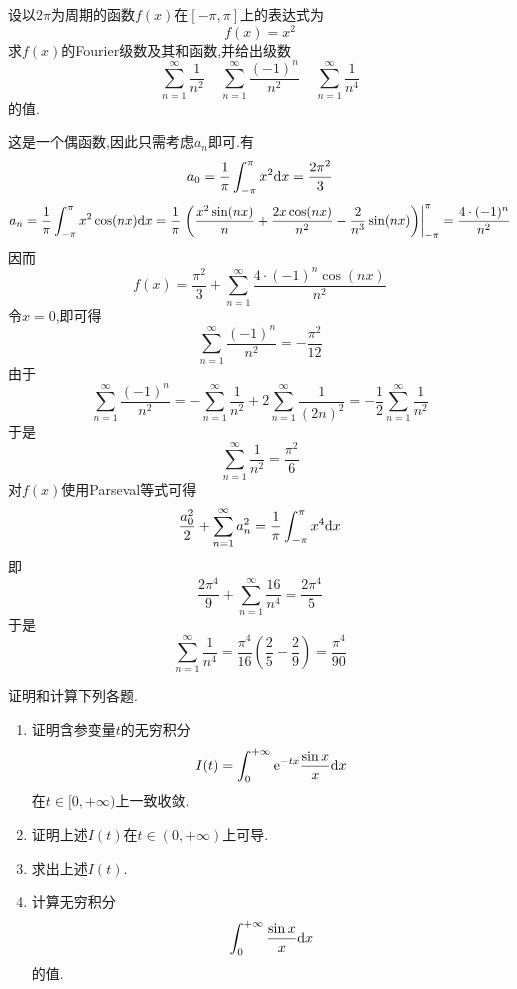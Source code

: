 \documentclass{ctexart}
\begin{document}
\begin{problem}[7.(20\songti{分})]
    设以$2\pi$为周期的函数$f(x)$在$[-\pi,\pi]$上的表达式为
    \[f(x)=x^2\]
    求$f(x)$的Fourier级数及其和函数,并给出级数
    \[\sum_{n=1}^{\infty}\dfrac{1}{n^2}
    \ \ \ \ \ \sum_{n=1}^{\infty}\dfrac{(-1)^n}{n^2}
    \ \ \ \ \ \sum_{n=1}^{\infty}\dfrac{1}{n^4}\]
    的值.

\end{problem}
\begin{solution}
    这是一个偶函数,因此只需考虑$a_n$即可.有
    \[a_0=\dfrac{1}{\pi}\int_{-\pi}^{\pi}x^2\mathrm{d} x=\dfrac{2\pi^2}{3}\]
    \[a_n=\dfrac{1}{\pi}\int_{-\pi}^{\pi}x^2\cos(nx)\mathrm{d} x
    =\dfrac{1}{\pi}\left.\left(\dfrac{x^2\sin(nx)}{n}+\dfrac{2x\cos(nx)}{n^2}-\dfrac{2}{n^3}\sin(nx)\right)\right|_{-\pi}^{\pi}
    =\dfrac{4\cdot(-1)^n}{n^2}\]
    因而
    \[f(x)=\dfrac{\pi^2}{3}+\sum_{n=1}^{\infty}\dfrac{4\cdot(-1)^n\cos(nx)}{n^2}\]
    令$x=0$,即可得
    \[\sum_{n=1}^{\infty}\dfrac{(-1)^n}{n^2}=-\dfrac{\pi^2}{12}\]
    由于
    \[\sum_{n=1}^{\infty}\dfrac{(-1)^n}{n^2}=-\sum_{n=1}^{\infty}\dfrac{1}{n^2}+2\sum_{n=1}^{\infty}\dfrac{1}{(2n)^2}=-\dfrac12\sum_{n=1}^{\infty}\dfrac{1}{n^2}\]
    于是
    \[\sum_{n=1}^{\infty}\dfrac{1}{n^2}=\dfrac{\pi^2}{6}\]
    对$f(x)$使用Parseval等式可得
    \[\dfrac{a_0^2}{2}+\sum_{n=1}^{\infty}a_n^2=\dfrac{1}{\pi}\int_{-\pi}^{\pi}x^4\mathrm{d} x\]
    即
    \[\dfrac{2\pi^4}{9}+\sum_{n=1}^{\infty}\dfrac{16}{n^4}=\dfrac{2\pi^4}{5}\]
    于是
    \[\sum_{n=1}^{\infty}\dfrac{1}{n^4}=\dfrac{\pi^4}{16}\left(\dfrac{2}{5}-\dfrac{2}{9}\right)=\dfrac{\pi^4}{90}\]

\end{solution}
\begin{problem}[8.(10\songti{分})]
    证明和计算下列各题.
    \begin{enumerate}[label=\tbf{(\arabic*)},topsep=0pt,parsep=0pt,itemsep=0pt,partopsep=0pt]
        \item 证明含参变量$t$的无穷积分
            \[I(t)=\int_0^{+\infty}\mathrm{e}^{-tx}\dfrac{\sin x}{x}\mathrm{d} x\]
            在$t\in[0,+\infty)$上一致收敛.
        \item 证明上述$I(t)$在$t\in(0,+\infty)$上可导.
        \item 求出上述$I(t)$.
        \item 计算无穷积分
            \[\int_0^{+\infty}\dfrac{\sin x}{x}\mathrm{d} x\]
            的值.
    \end{enumerate}

\end{problem}
\end{document}
